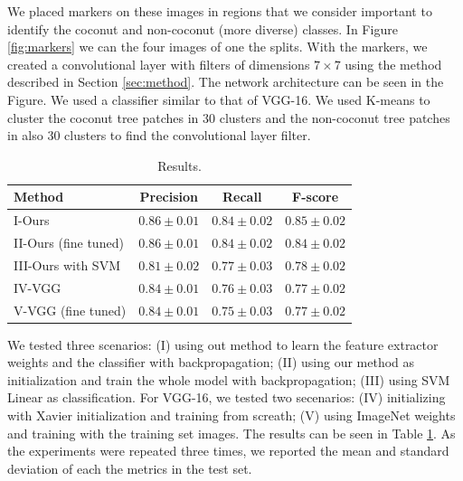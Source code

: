 \documentclass[a4paper,conference]{IEEEtran}
\begin{document}
We placed markers on these images in regions that we consider important to identify the coconut and non-coconut (more diverse) classes. In Figure \ref{fig:markers} we can the four images of one the splits. With the markers, we created a convolutional layer with filters of dimensions $7 \times 7$ using the method described in Section \ref{sec:method}. The network architecture can be seen in the Figure. We used a classifier similar to that of VGG-16. We used K-means to cluster the coconut tree patches in 30 clusters and the non-coconut tree patches in also 30 clusters to find the convolutional layer filter. 

\begin{table}[!t]
  \begin{center}
  \begin{tabular}{|l|c|c|c|}
  \hline
   Method & Precision & Recall & F-score \\
  \hline\hline
    I-Ours & $\boldsymbol{0.86 \pm 0.01}$ & $\boldsymbol{0.84 \pm 0.02}$ & $\boldsymbol{0.85 \pm 0.02}$\\
    II-Ours (fine tuned) & $\boldsymbol{0.86 \pm 0.01}$ & $\boldsymbol{0.84 \pm 0.02}$ & $0.84 \pm 0.02$\\
    III-Ours with SVM & $0.81 \pm 0.02$ & $0.77 \pm 0.03$ & $0.78 \pm 0.02$\\
    IV-VGG & $0.84 \pm 0.01$ & $0.76 \pm 0.03$ & $0.77 \pm 0.02 $ \\
    V-VGG (fine tuned) & $0.84 \pm 0.01$ & $0.75 \pm 0.03$ & $0.77 \pm 0.02 $ \\
  \hline
  \end{tabular}
  \end{center}
  \caption{Results.}
  \label{tab:results}
\end{table}


We tested three scenarios: (I) using out method to learn the feature extractor weights and the classifier with backpropagation; (II) using our method as initialization and train the whole model with backpropagation; (III) using SVM Linear as classification. For VGG-16, we tested two secenarios: (IV) initializing with Xavier initialization and training from screath; (V) using ImageNet weights and training with the training set images. The results can be seen in Table \ref{tab:results}. As the experiments were repeated three times, we reported the mean and standard deviation of each the metrics in the test set. 
\end{document}
